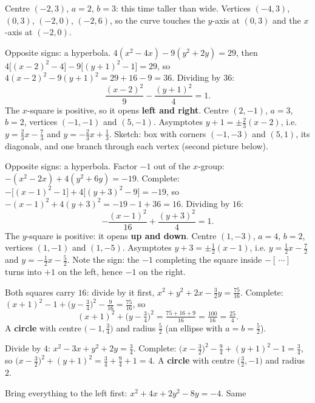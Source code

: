 \begin{solutions}
\[        \]
        Centre $(-2,3)$, $a=2$, $b=3$: this time taller than wide.
        Vertices $(-4,3)$, $(0,3)$, $(-2,0)$, $(-2,6)$, so the curve
        touches the $y$-axis at $(0,3)$ and the $x$-axis at $(-2,0)$.
  \item Opposite signs: a hyperbola. $4(x^{2}-4x)-9(y^{2}+2y)=29$, then
        $4\bigl[(x-2)^{2}-4\bigr]-9\bigl[(y+1)^{2}-1\bigr]=29$, so
        $4(x-2)^{2}-9(y+1)^{2}=29+16-9=36$. Dividing by $36$:
        \[
          \frac{(x-2)^{2}}{9}-\frac{(y+1)^{2}}{4}=1 .
        \]
        The $x$-square is positive, so it opens \textbf{left and right}.
        Centre $(2,-1)$, $a=3$, $b=2$, vertices $(-1,-1)$ and $(5,-1)$.
        Asymptotes $y+1=\pm\tfrac23(x-2)$, i.e.
        $y=\tfrac23x-\tfrac73$ and $y=-\tfrac23x+\tfrac13$. Sketch: box with
        corners $(-1,-3)$ and $(5,1)$, its diagonals, and one branch
        through each vertex (second picture below).
  \item Opposite signs: a hyperbola. Factor $-1$ out of the $x$-group:
        $-(x^{2}-2x)+4(y^{2}+6y)=-19$. Complete:
        $-\bigl[(x-1)^{2}-1\bigr]+4\bigl[(y+3)^{2}-9\bigr]=-19$, so
        $-(x-1)^{2}+4(y+3)^{2}=-19-1+36=16$. Dividing by $16$:
        \[
          -\frac{(x-1)^{2}}{16}+\frac{(y+3)^{2}}{4}=1 .
        \]
        The $y$-square is positive: it opens \textbf{up and down}. Centre
        $(1,-3)$, $a=4$, $b=2$, vertices $(1,-1)$ and $(1,-5)$. Asymptotes
        $y+3=\pm\tfrac12(x-1)$, i.e. $y=\tfrac12x-\tfrac72$ and
        $y=-\tfrac12x-\tfrac52$. Note the sign: the $-1$ completing the
        square inside $-[\,\cdots]$ turns into $+1$ on the left, hence
        $-1$ on the right.
  \item Both squares carry $16$: divide by it first,
        $x^{2}+y^{2}+2x-\tfrac32y=\tfrac{75}{16}$. Complete:
        $(x+1)^{2}-1+\bigl(y-\tfrac34\bigr)^{2}-\tfrac{9}{16}=\tfrac{75}{16}$,
        so
        \[
          (x+1)^{2}+\bigl(y-\tfrac34\bigr)^{2}
          =\tfrac{75+16+9}{16}=\tfrac{100}{16}=\tfrac{25}{4} .
        \]
        A \textbf{circle} with centre $\bigl(-1,\tfrac34\bigr)$ and radius
        $\tfrac52$ (an ellipse with $a=b=\tfrac52$).
  \item Divide by $4$: $x^{2}-3x+y^{2}+2y=\tfrac34$. Complete:
        $\bigl(x-\tfrac32\bigr)^{2}-\tfrac94+(y+1)^{2}-1=\tfrac34$, so
        $\bigl(x-\tfrac32\bigr)^{2}+(y+1)^{2}=\tfrac34+\tfrac94+1=4$. A
        \textbf{circle} with centre $\bigl(\tfrac32,-1\bigr)$ and radius
        $2$.
  \item Bring everything to the left first: $x^{2}+4x+2y^{2}-8y=-4$. Same

\end{solutions}
